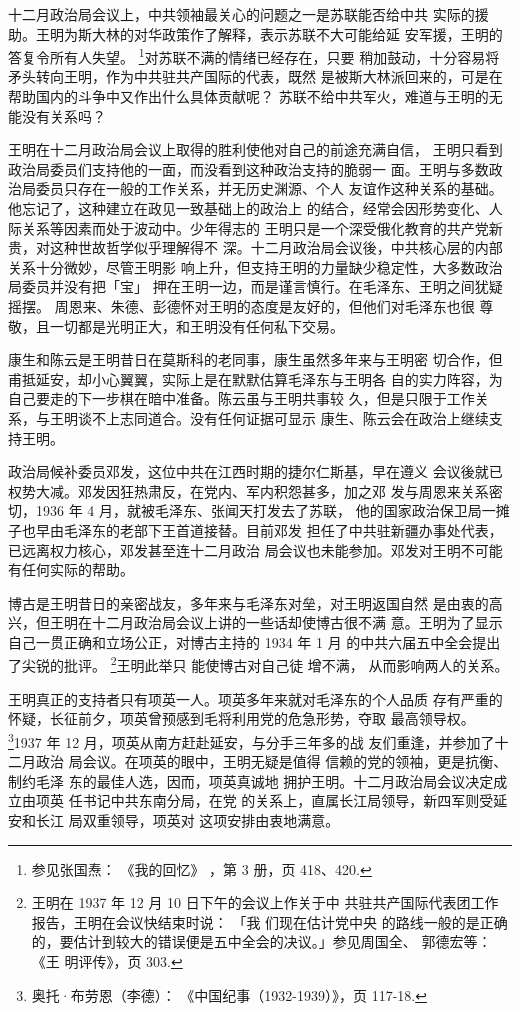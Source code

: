 十二月政治局会议上，中共领袖最关心的问题之一是苏联能否给中共
实际的援助。王明为斯大林的对华政策作了解释，表示苏联不大可能给延
安军援，王明的答复令所有人失望。 \footnote{参见张国焘：
《我的回忆》
，第 3 册，页 418、420.}对苏联不满的情绪已经存在，只要
稍加鼓动，十分容易将矛头转向王明，作为中共驻共产国际的代表，既然
是被斯大林派回来的，可是在帮助国内的斗争中又作出什么具体贡献呢？
苏联不给中共军火，难道与王明的无能没有关系吗？

王明在十二月政治局会议上取得的胜利使他对自己的前途充满自信，
王明只看到政治局委员们支持他的一面，而没看到这种政治支持的脆弱一
面。王明与多数政治局委员只存在一般的工作关系，并无历史渊源、个人
友谊作这种关系的基础。他忘记了，这种建立在政见一致基础上的政治上
的结合，经常会因形势变化、人际关系等因素而处于波动中。少年得志的
王明只是一个深受俄化教育的共产党新贵，对这种世故哲学似乎理解得不
深。十二月政治局会议後，中共核心层的内部关系十分微妙，尽管王明影
响上升，但支持王明的力量缺少稳定性，大多数政治局委员并没有把「宝」
押在王明一边，而是谨言慎行。在毛泽东、王明之间犹疑摇摆。
周恩来、朱德、彭德怀对王明的态度是友好的，但他们对毛泽东也很
尊敬，且一切都是光明正大，和王明没有任何私下交易。

康生和陈云是王明昔日在莫斯科的老同事，康生虽然多年来与王明密
切合作，但甫抵延安，却小心翼翼，实际上是在默默估算毛泽东与王明各
自的实力阵容，为自己要走的下一步棋在暗中准备。陈云虽与王明共事较
久，但是只限于工作关系，与王明谈不上志同道合。没有任何证据可显示
康生、陈云会在政治上继续支持王明。

政治局候补委员邓发，这位中共在江西时期的捷尔仁斯基，早在遵义
会议後就已权势大减。邓发因狂热肃反，在党内、军内积怨甚多，加之邓
发与周恩来关系密切，1936 年 4 月，就被毛泽东、张闻天打发去了苏联，
他的国家政治保卫局一摊子也早由毛泽东的老部下王首道接替。目前邓发
担任了中共驻新疆办事处代表，已远离权力核心，邓发甚至连十二月政治
局会议也未能参加。邓发对王明不可能有任何实际的帮助。

博古是王明昔日的亲密战友，多年来与毛泽东对垒，对王明返国自然 是由衷的高
兴，但王明在十二月政治局会议上讲的一些话却使博古很不满 意。王明为了显示
自己一贯正确和立场公正，对博古主持的 1934 年 1 月 的中共六届五中全会提出
了尖锐的批评。 \footnote{王明在 1937 年 12 月 10 日下午的会议上作关于中
共驻共产国际代表团工作报告，王明在会议快结束时说： 「我 们现在估计党中央
的路线一般的是正确的，要估计到较大的错误便是五中全会的决议。」参见周国全、
郭德宏等： 《王 明评传》，页 303.  }王明此举只 能使博古对自己徒 增不满，
从而影响两人的关系。

王明真正的支持者只有项英一人。项英多年来就对毛泽东的个人品质 存有严重的
怀疑，长征前夕，项英曾预感到毛将利用党的危急形势，夺取 最高领导权。
\footnote{奥托·布劳恩（李德）：
《中国纪事（1932-1939）》，页 117-18.}1937 年
12 月，项英从南方赶赴延安，与分手三年多的战 友们重逢，并参加了十二月政治
局会议。在项英的眼中，王明无疑是值得 信赖的党的领袖，更是抗衡、制约毛泽
东的最佳人选，因而，项英真诚地 拥护王明。十二月政治局会议决定成立由项英
任书记中共东南分局，在党 的关系上，直属长江局领导，新四军则受延安和长江
局双重领导，项英对 这项安排由衷地满意。

